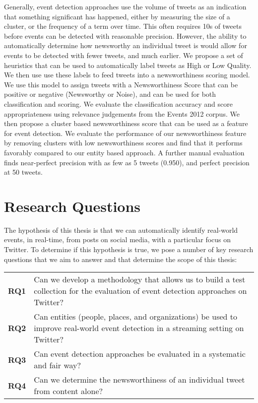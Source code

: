Generally, event detection approaches use the volume of tweets as an indication that something significant has happened, either by measuring the size of a cluster, or the frequency of a term over time.
This often requires 10s of tweets before events can be detected with reasonable precision.
However, the ability to automatically determine how newsworthy an individual tweet is would allow for events to be detected with fewer tweets, and much earlier.
We propose a set of heuristics that can be used to automatically label tweets as High or Low Quality.
We then use use these labels to feed tweets into a newsworthiness scoring model.
We use this model to assign tweets with a Newsworthiness Score that can be positive or negative (Newsworthy or Noise), and can be used for both classification and scoring.
We evaluate the classification accuracy and score appropriateness using relevance judgements from the Events 2012 corpus.
We then propose a cluster based newsworthiness score that can be used as a feature for event detection.
We evaluate the performance of our newsworthiness feature by removing clusters with low newsworthiness scores and find that it performs favorably compared to our entity based approach.
A further manual evaluation finds near-perfect precision with as few as 5 tweets (0.950), and perfect precision at 50 tweets.

\section{Research Questions}
The hypothesis of this thesis is that we can automatically identify real-world events, in real-time, from posts on social media, with a particular focus on Twitter.
To determine if this hypothesis is true, we pose a number of key research questions that we aim to answer and that determine the scope of this thesis:

\begin{tabulary}{\textwidth}{l L}
\textbf{RQ1} & Can we develop a methodology that allows us to build a test collection for the evaluation of event detection approaches on Twitter? \\

\textbf{RQ2} & Can entities (people, places, and organizations) be used to improve real-world event detection in a streaming setting on Twitter? \\

\textbf{RQ3} & Can event detection approaches be evaluated in a systematic and fair way? \\

\textbf{RQ4} & Can we determine the newsworthiness of an individual tweet from content alone? \\
\end{tabulary}

